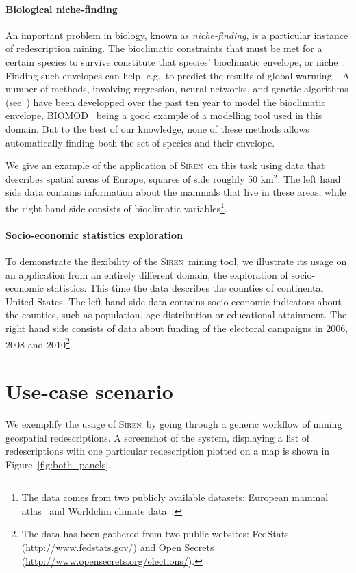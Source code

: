 \documentclass{sig-alternate}
\newcommand{\prg}[1]{\paragraph{#1}}
\newcommand{\Siren}{\textsc{Siren}}
\begin{document}
\prg{Biological niche-finding} 
An important problem in biology, known as \emph{niche-finding}, is a
particular instance of redescription mining.  The bioclimatic
constraints that must be met for a certain species to survive
constitute that species' bioclimatic envelope, or
niche~\cite{grinnell17niche}.  Finding such envelopes can help, e.g.\
to predict the results of global warming~\cite{pearson03predicting}.
A number of methods, involving regression, neural networks, and
genetic algorithms (see~\cite{soberon05interpretation}) have been
developped over the past ten year to model the bioclimatic envelope,
\textsc{BIOMOD}~\cite{thuiller09biomod} being a good example of a
modelling tool used in this domain.  But to the best of our knowledge,
none of these methods allows automatically finding both the set of
species and their envelope.

We give an example of the application of \Siren\ on this task using data
that describes spatial areas of Europe, squares of side roughly 50
km$^2$.  The left hand side data contains information about the
mammals that live in these areas, while the right hand side consists
of bioclimatic variables\footnote{The data comes from two publicly available
datasets: European mammal atlas~\cite{mitchell-jones99atlas} and
Worldclim climate data~\cite{hijmans05very}.}.

\prg{Socio-economic statistics exploration}


To demonstrate the flexibility of the \Siren\ mining tool, we illustrate its usage on
an application from an entirely different domain, the exploration of socio-economic statistics. This time the data describes the counties
of continental United-States.  The left hand side data
contains socio-economic indicators about the counties, such as
population, age distribution or educational attainment. The right hand
side consists of data about funding of the electoral campaigns in
2006, 2008 and 2010\footnote{The data has been gathered from two public
websites: FedStats (\url{http://www.fedstats.gov/}) and Open
Secrets (\url{http://www.opensecrets.org/elections/}).}.


\section{Use-case scenario}
\label{sec:scenarios}
We exemplify the usage of \Siren\ by going through a generic workflow of
mining geospatial redescriptions.  A screenshot of the system,
displaying a list of redescriptions with one
particular redescription plotted on a map is shown in
Figure~\ref{fig:both_panels}.
\end{document}
